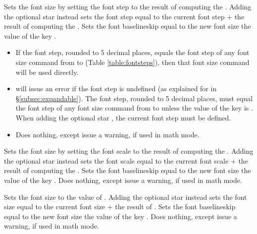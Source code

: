 \documentclass{beery}
\begin{document}
Sets the font size by setting the font step to the result of computing the .
Adding the optional star \sarg{} instead sets the font step equal to the current font step + the result of computing the .
Sets the font baselineskip equal to the new font size \texttimes{} the value of the key .

\begin{itemize}
  \item
  If the font step, rounded to \num{5} decimal places, equals the font step of any font size command from  to  (Table \ref{table:fontsteps}), then that font size command will be used directly.
  \item
   will issue an error if the font step is undefined (as explained for  in \S\ref{subsec:expandable}).
  The font step, rounded to \num{5} decimal places, must equal the font step of any font size command from  to  unless the value of the key  is .
  When adding the optional star \sarg, the current font step must be defined.
  \item
  Does nothing, except issue a warning, if used in math mode.
\end{itemize}

\begin{displaycode}
   \sarg{} 
\end{displaycode}

Sets the font size by setting the font scale to the result of computing the .
Adding the optional star \sarg{} instead sets the font scale equal to the current font scale + the result of computing the .
Sets the font baselineskip equal to the new font size \texttimes{} the value of the key .
Does nothing, except issue a warning, if used in math mode.

\begin{displaycode}
   \sarg{} 
\end{displaycode}

Sets the font size to the value of .
Adding the optional star \sarg{} instead sets the font size equal to the current font size + the result of .
Sets the font baselineskip equal to the new font size \texttimes{} the value of the key .
Does nothing, except issue a warning, if used in math mode.
\end{document}
